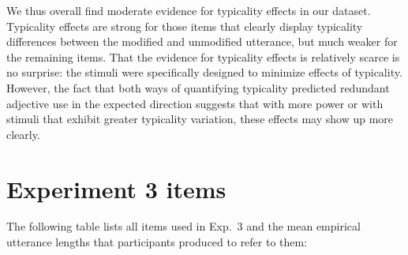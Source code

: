 \documentclass[11pt]{article}
\begin{document}
We thus overall find moderate evidence for typicality effects in our dataset. Typicality effects are strong for those items that clearly display typicality differences between the modified and unmodified utterance, but much weaker for the remaining items. That the evidence for typicality effects is relatively scarce is no surprise: the stimuli were specifically designed to minimize effects of typicality. However, the fact that both ways of quantifying typicality predicted redundant adjective use in the expected direction suggests that with more power or with stimuli that exhibit greater typicality variation, these effects may show up more clearly.

\section{Experiment 3 items}
\label{app:taxonomicstimuli}


The following table lists all items used in Exp.~3 and the mean empirical utterance lengths that participants produced to refer to them:
\end{document}
